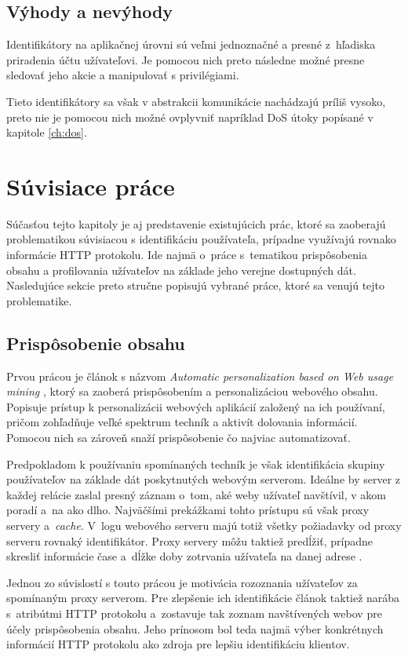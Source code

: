 \documentclass[
  digital, %
  oneside, %
  table,   %
  lof,     %
  nolot,   %
  nocover
]{fithesis3}
\begin{document}
\subsection{Výhody a nevýhody}
Identifikátory na aplikačnej úrovni sú veľmi jednoznačné a presné z~hľadiska
priradenia účtu užívateľovi. Je pomocou nich preto následne možné presne
sledovať jeho akcie a manipulovať s privilégiami.

Tieto identifikátory sa však v abstrakcii komunikácie nachádzajú príliš vysoko,
preto nie je pomocou nich možné ovplyvniť napríklad DoS útoky popísané v
kapitole \ref{ch:dos}.

\section{Súvisiace práce}
Súčasťou tejto kapitoly je aj predstavenie existujúcich prác, ktoré sa zaoberajú 
problematikou súvisiacou s identifikáciu používateľa, prípadne využívajú rovnako
informácie HTTP protokolu. Ide najmä o~práce s~tematikou prispôsobenia obsahu a
profilovania užívateľov na základe jeho verejne dostupných dát. Nasledujúce sekcie 
preto stručne popisujú vybrané práce, ktoré sa venujú tejto problematike.

\subsection{Prispôsobenie obsahu}
Prvou prácou je článok s názvom \textit{Automatic personalization based on Web usage mining} \cite{Mobasher:2000:APB},
ktorý sa zaoberá prispôsobením a personalizáciou webového obsahu. Popisuje prístup k personalizácii webových
aplikácií založený na ich používaní, pričom zohľadňuje veľké spektrum techník a aktivít dolovania informácií.
Pomocou nich sa zároveň snaží prispôsobenie čo najviac automatizovať.

Predpokladom k používaniu spomínaných techník je však identifikácia skupiny používateľov na
základe dát poskytnutých webovým serverom. Ideálne by server z každej relácie zaslal presný záznam o~tom, 
aké weby užívateľ navštívil, v akom poradí a~na ako dlho. Najväčšími prekážkami tohto prístupu sú však proxy
servery a~\textit{cache}. V~logu webového serveru majú totiž všetky požiadavky od proxy serveru
rovnaký identifikátor. Proxy servery môžu taktiež predĺžiť, prípadne skresliť informácie čase a~dĺžke doby
zotrvania užívateľa na danej adrese \cite{Mobasher:2000:APB}.

Jednou zo súvislostí s touto prácou je motivácia rozoznania užívateľov za spomínaným proxy serverom.
Pre zlepšenie ich identifikácie článok taktiež narába s~atribútmi HTTP protokolu a~zostavuje
tak zoznam navštívených webov pre účely prispôsobenia obsahu. Jeho prínosom bol teda najmä výber konkrétnych 
informácií HTTP protokolu ako zdroja pre lepšiu identifikáciu klientov.
\end{document}
